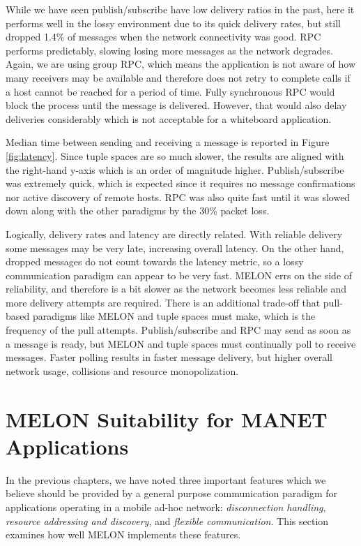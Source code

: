While we have seen publish/subscribe have low delivery ratios in the past\cite{collins2010quantitative}, here it performs well in the lossy environment due to its quick delivery rates, but still dropped 1.4\% of messages when the network connectivity was good. RPC performs predictably, slowing losing more messages as the network degrades. Again, we are using group RPC, which means the application is not aware of how many receivers may be available and therefore does not retry to complete calls if a host cannot be reached for a period of time. Fully synchronous RPC would block the process until the message is delivered. However, that would also delay deliveries considerably which is not acceptable for a whiteboard application.

Median time between sending and receiving a message is reported in Figure \ref{fig:latency}. Since tuple spaces are so much slower, the results are aligned with the right-hand y-axis which is an order of magnitude higher. Publish/subscribe was extremely quick, which is expected since it requires no message confirmations nor active discovery of remote hosts. RPC was also quite fast until it was slowed down along with the other paradigms by the 30\% packet loss.

Logically, delivery rates and latency are directly related. With reliable delivery some messages may be very late, increasing overall latency. On the other hand, dropped messages do not count towards the latency metric, so a lossy communication paradigm can appear to be very fast. MELON errs on the side of reliability, and therefore is a bit slower as the network becomes less reliable and more delivery attempts are required. There is an additional trade-off that pull-based paradigms like MELON and tuple spaces must make, which is the frequency of the pull attempts. Publish/subscribe and RPC may send as soon as a message is ready, but MELON and tuple spaces must continually poll to receive messages. Faster polling results in faster message delivery, but higher overall network usage, collisions and resource monopolization.

\section{MELON Suitability for MANET Applications}

In the previous chapters, we have noted three important features which we believe should be provided by a general purpose communication paradigm for applications operating in a mobile ad-hoc network: \textit{disconnection handling}, \textit{resource addressing and discovery}, and \textit{flexible communication}. This section examines how well MELON implements these features.

